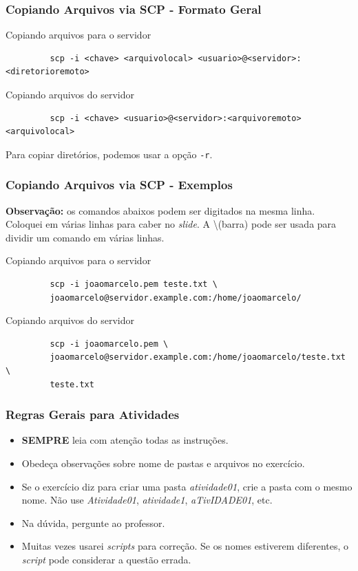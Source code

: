 \documentclass{beamer}
\begin{document}
\begin{frame}[fragile]
   \frametitle{Copiando Arquivos via SCP - Formato Geral}
   \begin{block}{Copiando arquivos para o servidor}
      \begin{verbatim}
         scp -i <chave> <arquivolocal> <usuario>@<servidor>:<diretorioremoto>
      \end{verbatim}
   \end{block}
   \begin{block}{Copiando arquivos do servidor}
      \begin{verbatim}
         scp -i <chave> <usuario>@<servidor>:<arquivoremoto> <arquivolocal>
      \end{verbatim}
   \end{block}
   Para copiar diretórios, podemos usar a opção \texttt{-r}.
\end{frame}

\begin{frame}[fragile]
   \frametitle{Copiando Arquivos via SCP - Exemplos}
   \small
   \textbf{Observação:} os comandos abaixos podem ser digitados na mesma linha. Coloquei em várias linhas para caber no \textit{slide}. A \textbackslash (barra)  pode ser usada para dividir um comando em várias linhas.
   \normalsize
   \begin{block}{Copiando arquivos para o servidor}
      \begin{verbatim}
         scp -i joaomarcelo.pem teste.txt \
         joaomarcelo@servidor.example.com:/home/joaomarcelo/
      \end{verbatim}
   \end{block}
   \begin{block}{Copiando arquivos do servidor}
      \begin{verbatim}
         scp -i joaomarcelo.pem \
         joaomarcelo@servidor.example.com:/home/joaomarcelo/teste.txt \
         teste.txt
      \end{verbatim}
   \end{block}
\end{frame}

\begin{frame}
   \frametitle{Regras Gerais para Atividades}
   \begin{itemize}
      \item \textbf{SEMPRE} leia com atenção todas as instruções.
      \item Obedeça observações sobre nome de pastas e arquivos no exercício.
      \item Se o exercício diz para criar uma pasta \textit{atividade01}, crie a pasta com o mesmo nome. Não use \textit{Atividade01}, \textit{atividade1}, \textit{aTivIDADE01}, etc.
      \item Na dúvida, pergunte ao professor.
      \item Muitas vezes usarei \textit{scripts} para correção. Se os nomes estiverem diferentes, o \textit{script} pode considerar a questão errada.
   \end{itemize}
\end{frame}
\end{document}
